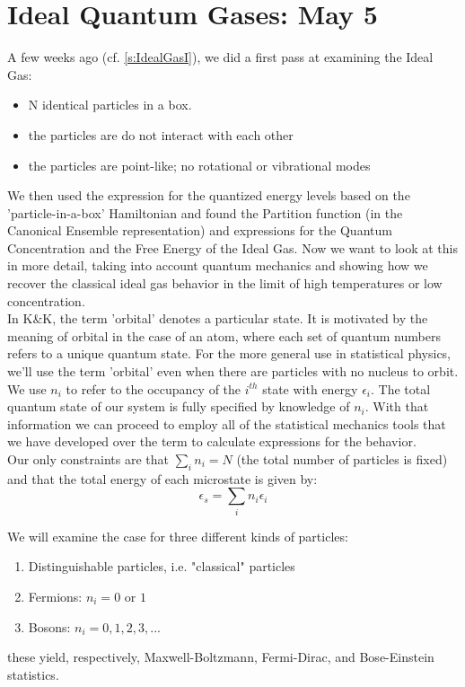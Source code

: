 \section{Ideal Quantum Gases: May 5}
A few weeks ago (cf. \cref{s:IdealGasI}), we did a first pass at examining the 
Ideal Gas:
\begin{itemize}
\item N identical particles in a box.
\item the particles are do not interact with each other
\item the particles are point-like; no rotational or vibrational modes
\end{itemize}

We then used the expression for the quantized energy levels based on the
'particle-in-a-box' Hamiltonian and found the Partition function (in the 
Canonical Ensemble representation) and expressions for the Quantum
Concentration and the Free Energy of the Ideal Gas. Now we want to look
at this in more detail, taking into account quantum mechanics and showing
how we recover the classical ideal gas behavior in the limit of high temperatures or low concentration.\\

In K\&K, the term 'orbital' denotes a particular state. It is motivated by
the meaning of orbital in the case of an atom, where each set of quantum
numbers refers to a unique quantum state. For the more general use in
statistical physics, we'll use the term 'orbital' even when there are
particles with no nucleus to orbit.\\

We use $n_i$ to refer to the occupancy of the $i^{th}$ state with 
energy $\epsilon_i$. The total quantum state of our system is fully specified by knowledge of $n_i$. With that information we can proceed to employ all of the
statistical mechanics tools that we have developed over the term to calculate
expressions for the behavior.\\

Our only constraints are that $\sum_i n_i = N$ (the total number of particles is fixed) and that the total energy of each microstate is given by:
\begin{equation}
\epsilon_s = \sum_i n_i \epsilon_i
\end{equation}

We will examine the case for three different kinds of particles:
\begin{enumerate}
\item Distinguishable particles, i.e. "classical" particles
\item Fermions: $n_i = 0$ or $1$
\item Bosons: $n_i = 0,1,2,3,...$
\end{enumerate}
these yield, respectively, Maxwell-Boltzmann, Fermi-Dirac, and Bose-Einstein
statistics.

